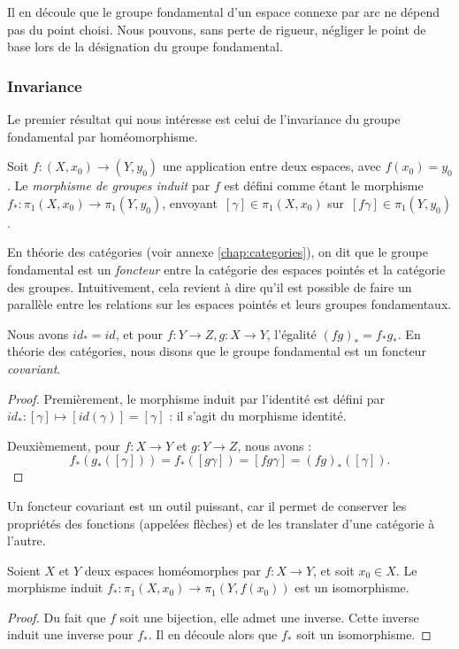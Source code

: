 \begin{remark}
Il en découle que le groupe fondamental d'un espace connexe par arc ne dépend pas du point choisi. Nous pouvons, sans perte de rigueur, négliger le point de base lors de la désignation du groupe fondamental.
\end{remark}

\subsubsection{Invariance}

Le premier résultat qui nous intéresse est celui de l'invariance du groupe fondamental par homéomorphisme.

\begin{definition}
Soit $f:(X,x_0)\to(Y,y_0)$ une application entre deux espaces, avec $f(x_0)=y_0$. Le \emph{morphisme de groupes induit} par $f$ est défini comme étant le morphisme $f_\ast:\pi_1(X,x_0)\to\pi_1(Y,y_0)$, envoyant~$[\gamma]\in\pi_1(X,x_0)$ sur~$[f\gamma]\in\pi_1(Y,y_0)$. 
\end{definition}

En théorie des catégories (voir annexe \ref{chap:categories}), on dit que le groupe fondamental est un \emph{foncteur} entre la catégorie des espaces pointés et la catégorie des groupes. Intuitivement, cela revient à dire qu'il est possible de faire un parallèle entre les relations sur les espaces pointés et leurs groupes fondamentaux.

\begin{theorem}
Nous avons $id_\ast=id$, et pour $f:Y\to Z, g:X\to Y$,  l'égalité $(fg)_\ast=f_\ast g_\ast$. En théorie des catégories, nous disons que le groupe fondamental est un foncteur \emph{covariant}.
\end{theorem}
\begin{proof}
Premièrement, le morphisme induit par l'identité est défini par $id_\ast:[\gamma]\mapsto[id(\gamma)]=[\gamma]$ : il s'agit du morphisme identité.

Deuxièmement, pour $f:X\to Y$ et $g:Y\to Z$, nous avons : \[f_\ast(g_\ast([\gamma]))=f_\ast([g\gamma])=[fg\gamma]=(fg)_\ast([\gamma]).\]
\end{proof}

Un foncteur covariant est un outil puissant, car il permet de conserver les propriétés des fonctions (appelées flèches) et de les translater d'une catégorie à l'autre.

\begin{theorem}
Soient $X$ et $Y$ deux espaces homéomorphes par $f:X\to Y$, et soit $x_0\in X$. Le morphisme induit $f_\ast:\pi_1(X,x_0)\to\pi_1(Y,f(x_0))$ est un isomorphisme.
\end{theorem}
\begin{proof}
Du fait que $f$ soit une bijection, elle admet une inverse. Cette inverse induit une inverse pour $f_\ast$. Il en découle alors que $f_\ast$ soit un isomorphisme.
\end{proof}

